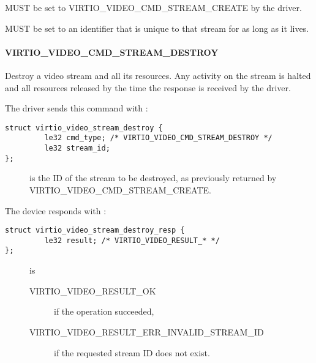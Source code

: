 
 MUST be set to VIRTIO\_VIDEO\_CMD\_STREAM\_CREATE by
the driver.


 MUST be set to an identifier that is unique to that
stream for as long as it lives.

\paragraph{VIRTIO_VIDEO_CMD_STREAM_DESTROY}\label{sec:Device Types / Video Device / Device Operation / Device Operation: Stream commands / VIRTIO_VIDEO_CMD_STREAM_DESTROY}

Destroy a video stream and all its resources. Any activity on the stream
is halted and all resources released by the time the response is
received by the driver.

The driver sends this command with
:

\begin{lstlisting}
struct virtio_video_stream_destroy {
         le32 cmd_type; /* VIRTIO_VIDEO_CMD_STREAM_DESTROY */
         le32 stream_id;
};
\end{lstlisting}

\begin{description}
\item[]
is the ID of the stream to be destroyed, as previously returned by
VIRTIO\_VIDEO\_CMD\_STREAM\_CREATE.
\end{description}

The device responds with
:

\begin{lstlisting}
struct virtio_video_stream_destroy_resp {
         le32 result; /* VIRTIO_VIDEO_RESULT_* */
};
\end{lstlisting}

\begin{description}
\item[]
is

\begin{description}
\item[VIRTIO\_VIDEO\_RESULT\_OK]
if the operation succeeded,
\item[VIRTIO\_VIDEO\_RESULT\_ERR\_INVALID\_STREAM\_ID]
if the requested stream ID does not exist.
\end{description}
\end{description}


